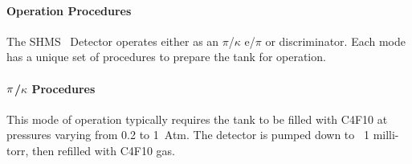 {\color{red}


\paragraph{Operation Procedures}
% 
% 
The SHMS \Cerenkov\ Detector operates either as an $\pi$/$\kappa$ e/$\pi$ or
discriminator. Each mode has a unique set of procedures to prepare the tank
for operation. 



\paragraph{$\bf{\pi}$/$\kappa$ Procedures}
This mode of operation typically requires the tank to be filled with
C4F10 at pressures varying from 0.2 to 1~Atm. The detector is pumped
down to ~1 milli-torr, then refilled with C4F10 gas.

}
